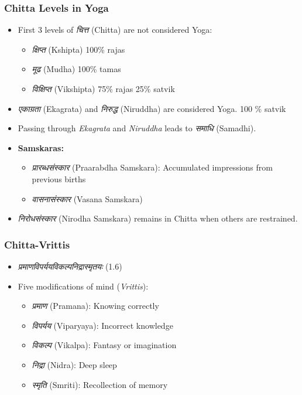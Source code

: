 \begin{frame}[fragile]\frametitle{Chitta Levels in Yoga}

    \begin{itemize}
        \item First 3 levels of \textit{चित्त} (Chitta) are not considered Yoga:
        \begin{itemize}
            \item \textit{क्षिप्त} (Kshipta) 100\% rajas
            \item \textit{मूढ} (Mudha) 100\% tamas
            \item \textit{विक्षिप्त} (Vikshipta) 75\% rajas 25\% satvik
        \end{itemize}
        \item \textit{एकाग्रता} (Ekagrata) and \textit{निरुद्ध} (Niruddha) are considered Yoga. 100 \% satvik
        \item Passing through \textit{Ekagrata} and \textit{Niruddha} leads to \textit{समाधि} (Samadhi).
        \item \textbf{Samskaras:}
        \begin{itemize}
            \item \textit{प्रारब्धसंस्कार} (Praarabdha Samskara): Accumulated impressions from previous births
            \item \textit{वासनासंस्कार} (Vasana Samskara)
        \end{itemize}
        \item \textit{निरोधसंस्कार} (Nirodha Samskara) remains in Chitta when others are restrained.
    \end{itemize}

\end{frame}

\begin{frame}[fragile]\frametitle{Chitta-Vrittis}
    \begin{itemize}
        \item \textit{प्रमाणविपर्ययविकल्पनिद्रास्मृतयः} (1.6)
        \item Five modifications of mind (\textit{Vrittis}):
        \begin{itemize}
            \item \textit{प्रमाण} (Pramana): Knowing correctly
            \item \textit{विपर्यय} (Viparyaya): Incorrect knowledge
            \item \textit{विकल्प} (Vikalpa): Fantasy or imagination
            \item \textit{निद्रा} (Nidra): Deep sleep
            \item \textit{स्मृति} (Smriti): Recollection of memory
        \end{itemize}
    \end{itemize}
\end{frame}

